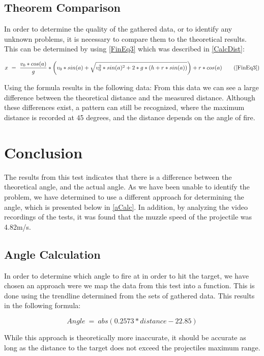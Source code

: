\subsection{Theorem Comparison}
In order to
determine the quality of the gathered data, or to identify any unknown
problems, it is necessary to compare them to the theoretical results. This can
be determined by using \autoref{FinEq3} which was described in \autoref{CalcDist}:

\begin{equation*}
x\ =\ \frac{v_0*cos(a)}{g}* \left(
v_0*sin(a)+\sqrt{v_0^2*sin(a)^2+2*g*(h+r*sin(a))}\right)+r*cos(a)
\tag{\ref*{FinEq3}}
\end{equation*}

Using the formula results in the following data:
From this data we can see a large difference between the theoretical distance
and the measured distance. Although these differences exist, a pattern can still
be recognized, where the maximum distance is recorded at 45 degrees, and the
distance depends on the angle of fire. 

\section{Conclusion}
The results from this test indicates that there is a difference between the
theoretical angle, and the actual angle. As
we have been unable to identify the problem, we have determined to use a
different approach for determining the angle, which is presented below in
\autoref{aCalc}. In addition, by analyzing the video recordings of the tests, it
was found that the muzzle speed of the projectile was 4.82m/s.

\subsection{Angle Calculation}\label{aCalc}
In order to determine which angle to fire at in order to hit the target, we have
chosen an approach were we map the data from this test into a function. This is
done using the trendline determined from the sets of gathered data. This results
in the following formula:

\begin{equation}\label{angleCalc}
Angle\ =\ abs(0.2573 * distance - 22.85)
\end{equation} 

While this approach is theoretically more inaccurate, it should be
accurate as long as the distance to the target does not exceed the projectiles
maximum range. 
